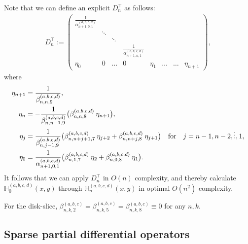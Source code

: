 \documentclass[11pt, oneside]{article}   	%
\newcommand{\hdop}{H}
\newcommand{\bighdop}{\mathbb{\hdop}}
\newcommand{\Dnt}{D^\top_n}
\newcommand{\betaabc}{\beta^{(a,b,c)}}
\newcommand{\alphaabcd}{\alpha^{(a,b,c,d)}}
\newcommand{\betaabcd}{\beta^{(a,b,c,d)}}
\newcommand{\bighdopabcd}{\bighdop^{(a,b,c,d)}}
\begin{document}
Note that we can define an explicit \(\Dnt\) as follows:
\begin{align*}
\Dnt := \begin{pmatrix}
		\frac{1}{\alphaabcd_{n+1,0,1}} & &  \\
		& \ddots & & &  \\
		& & \ddots & & \\
		& & & \frac{1}{\alphaabcd_{n+1,n,1}} & \\
		\eta_{0} & 0 & \hdots & 0 & \eta_{1} & \hdots & \hdots & \eta_{n+1}
	    \end{pmatrix},
\end{align*}
 where
 \begin{align*}
	\eta_{n+1} &= \frac{1}{\betaabcd_{n,n,9}}, \\ 
	\eta_{n} &= -\frac{1}{\betaabcd_{n,n-1,9}} \big( \betaabcd_{n,n,8} \: \eta_{n+1} \big), \\
	\eta_j &= \frac{1}{\betaabcd_{n,j-1,9}} \big( \betaabcd_{n,n+j+1,7} \: \eta_{j+2} + \betaabcd_{n,n+j,8} \: \eta_{j+1} \big) \qfor j = n-1,n-2,\dots,1, \\
	\eta_0 &= \frac{1}{\alphaabcd_{n+1,0,1}} \big( \betaabcd_{n,1,7} \: \eta_{2} + \betaabcd_{n,0,8} \: \eta_{1} \big).
\end{align*}
It follows that we can apply $\Dnt$ in $O(n)$ complexity, and thereby calculate $\bighdopabcd_{0}(x,y)$  through $\bighdopabcd_{n}(x,y)$ in optimal $O(n^2)$ complexity.

For the disk-slice, $\betaabc_{n,k,2} = \betaabc_{n,k,5} = \betaabc_{n,k,8} \equiv 0$ for any $n, k$.

%
\subsection{Sparse partial differential operators}\label{Section:PDOs}
\end{document}
